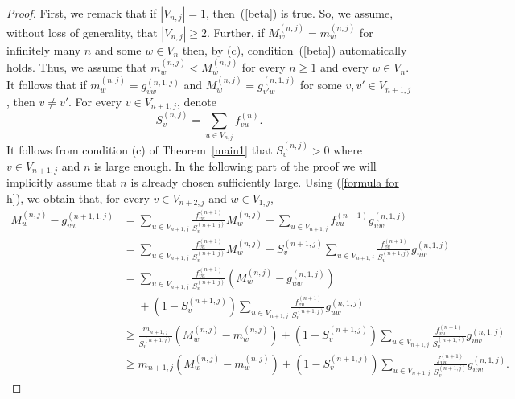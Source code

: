 \documentclass[11pt, english, reqno]{amsart}
\theoremstyle{definition}
\theoremstyle{remark}
\theoremstyle{plain}
\numberwithin{equation}{section}
\begin{document}
{\begin{proof}
First, we remark that if $|V_{n,j}| = 1$, then~(\ref{beta}) is true. So, we
assume, without loss of generality,  that $|V_{n,j}| \geq 2$. Further, if
$M_w^{(n,j)} = m_w^{(n,j)}$ for infinitely many $n$ and some $w \in V_n$
then, by (c), condition~(\ref{beta}) automatically holds. Thus, we assume
that $m_w^{(n,j)} < M_w^{(n,j)}$ for every $n \geq 1$ and every $w \in
V_n$. It follows that if $m_w^{(n,j)} = g_{vw}^{(n,1,j)}$ and $M_w^{(n,j)} =
g_{v'w}^{(n,1,j)}$ for some $v, v' \in V_{n+1,j}$, then $v \neq v'$.
For every $v \in V_{n+1,j}$, denote
$$
S_v^{(n,j)} = \sum_{u \in V_{n,j}} f_{vu}^{(n)}.
$$
It follows from condition (c) of Theorem~\ref{main1} that 
$S_v^{(n,j)} > 0$ 
where   $v \in V_{n+1,j}$ and $n$ is  large enough. In the following part of 
the proof we will implicitly assume  that $n$ is already chosen 
sufficiently  large.
Using (\ref{formula for h}), we obtain that,  for every $v \in V_{n+2,j}$ and
 $w \in V_{1,j}$,
 $$
 \begin{aligned}
 M_w^{(n,j)} - g_{vw}^{(n+1,1,j)} & = \sum_{u \in V_{n+1,j}}
\frac{f_{vu}^{(n+1)}}{S_{v}^{(n+1,j)}}M_w^{(n,j)} - \sum_{u \in
V_{n+1,j}}  f_{vu}^{(n+1)} g_{uw}^{(n,1,j)}\\
& = \sum_{u \in V_{n+1,j}}\frac{f_{vu}^{(n+1)}}{S_{v}^{(n+1,j)}}M_w^{(n,j)}
- {S_{v}^{(n+1,j)}} \sum_{u \in V_{n+1,j}} \frac{f_{vu}^{(n+1)}}{S_{v}^{(n
+1,j)}} g_{uw}^{(n,1,j)}\\
 & = \sum_{u \in V_{n+1,j}}\frac{f_{vu}^{(n+1)}}{S_{v}^{(n+1,j)}}
(M_w^{(n,j)} - g_{uw}^{(n,1,j)}) \\
& \ \ \ \ \ \ + (1 - S_{v}^{(n+1,j)})\sum_{u \in V_{n
+1,j}} \frac{f_{vu}^{(n+1)}}{S_{v}^{(n+1,j)}} g_{uw}^{(n,1,j)}\\
& \geq \frac{m_{n+1,j}}{S_{v}^{(n+1,j)}}(M_w^{(n,j)} - m_w^{(n,j)}) + (1 -
S_{v}^{(n+1,j)})\sum_{u \in V_{n+1,j}} \frac{f_{vu}^{(n+1)}}{S_{v}^{(n
+1,j)}} g_{uw}^{(n,1,j)}\\
& \geq m_{n+1,j}(M_w^{(n,j)} - m_w^{(n,j)}) + (1 - S_{v}^{(n+1,j)})
\sum_{u \in V_{n+1,j}} \frac{f_{vu}^{(n+1)}}{S_{v}^{(n+1,j)}}
g_{uw}^{(n,1,j)}.
 \end{aligned}
 $$


\end{proof}}
\end{document}
